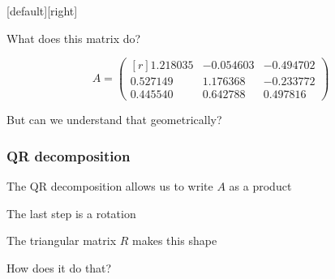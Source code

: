 \documentclass[handout,aspect=169]{beamer}
\begin{document}
[default][right]

\begin{frame}
\begin{center}
What does this matrix do?
\end{center}

\[
A= \begin{pmatrix*}[r]
   1.218035& -0.054603& -0.494702\\
   0.527149&  1.176368& -0.233772\\
   0.445540&  0.642788&  0.497816
\end{pmatrix*}
\]
\end{frame}

\begin{frame}
\vspace{6.5cm}
\begin{center}
But can we understand that geometrically?
\end{center}
\end{frame}

\begin{frame}
\frametitle{QR decomposition}
The QR decomposition allows us to write $A$ as a product
\begin{center}
\end{center}
\end{frame}

\begin{frame}
\vspace{6.5cm}
\begin{center}
The last step is a rotation
\end{center}
\end{frame}

\begin{frame}
\begin{center}
The triangular matrix $R$ makes this shape
\vspace{6.5cm}

How does it do that?
\end{center}
\end{frame}
\end{document}
